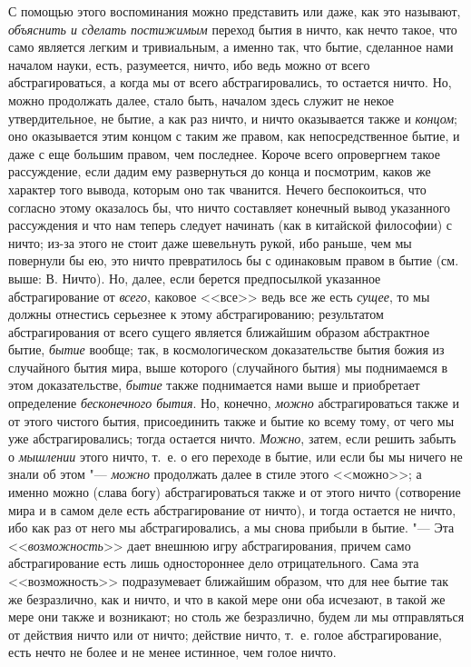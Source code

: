 С помощью этого воспоминания можно представить или даже, как это называют,
{\em объяснить и сделать постижимым} переход бытия в
ничто, как нечто такое, что само является легким и тривиальным, а именно
так, что бытие, сделанное нами началом науки, есть, разумеется, ничто, ибо
ведь можно от всего абстрагироваться, а когда мы от всего абстрагировались,
то остается ничто. Но, можно продолжать далее, стало быть, началом здесь
служит не некое утвердительное, не бытие, а как раз ничто, и ничто
оказывается также и {\em концом}; оно оказывается этим
концом с таким же правом, как непосредственное бытие, и даже с еще большим
правом, чем последнее. Короче всего опровергнем такое рассуждение, если
дадим ему развернуться до конца и посмотрим, каков же характер того вывода,
которым оно так чванится. Нечего беспокоиться, что согласно этому оказалось
бы, что ничто составляет конечный вывод указанного рассуждения и что нам
теперь следует начинать (как в китайской философии) с ничто; из-за этого не
стоит даже шевельнуть рукой, ибо раньше, чем мы повернули бы ею, это ничто
превратилось бы с одинаковым правом в бытие (см. выше: В. Ничто). Но,
далее, если берется предпосылкой указанное абстрагирование от
{\em всего}, каковое <<все>> ведь все же есть
{\em сущее}, то мы должны отнестись серьезнее к этому
абстрагированию; результатом абстрагирования от всего сущего является
ближайшим образом абстрактное бытие, {\em бытие}
вообще; так, в космологическом доказательстве бытия божия из случайного
бытия мира, выше которого (случайного бытия) мы поднимаемся в этом
доказательстве, {\em бытие} также поднимается нами выше
и приобретает определение {\em бесконечного бытия}. Но,
конечно, {\em можно} абстрагироваться также и от этого
чистого бытия, присоединить также и бытие ко всему тому, от чего мы уже
абстрагировались; тогда остается ничто. {\em Можно},
затем, если решить забыть о {\em мышлении} этого
ничто, т.~е. о его переходе в бытие, или если бы мы ничего не знали об этом
"--- {\em можно} продолжать далее в стиле этого <<можно>>; а
именно можно (слава богу) абстрагироваться также и от этого ничто
(сотворение мира и в самом деле есть абстрагирование от ничто), и тогда
остается не ничто, ибо как раз от него мы абстрагировались, а мы снова
прибыли в бытие. "--- Эта <<{\em возможность}>> дает внешнюю
игру абстрагирования, причем само абстрагирование есть лишь одностороннее
дело отрицательного. Сама эта <<возможность>> подразумевает ближайшим
образом, что для нее бытие так же безразлично, как и ничто, и что в какой
мере они оба исчезают, в такой же мере они также и возникают; но столь же
безразлично, будем ли мы отправляться от действия ничто или от ничто;
действие ничто, т.~е. голое абстрагирование, есть нечто не более и не менее
истинное, чем голое ничто.

